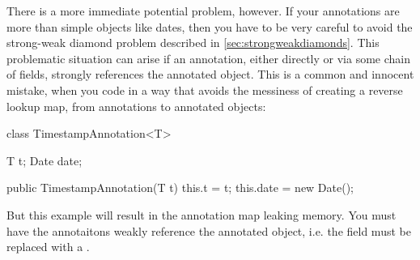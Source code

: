 There is a more immediate potential problem, however. If your annotations are
more than simple objects like dates, then you have to be very careful to avoid
the strong-weak diamond problem described in \autoref{sec:strongweakdiamonds}.
This problematic situation can arise if an annotation, either directly or via
some chain of fields, strongly references the annotated object. This is a common
and innocent mistake, when you code in a way that avoids the messiness of
creating a reverse lookup map, from annotations to annotated objects:
\begin{shortlisting}
class TimestampAnnotation<T> {
   T t;
   Date date;
   
   public TimestampAnnotation(T t) {
      this.t = t;
      this.date = new Date();
   }
}
\end{shortlisting}
But this example will result in the annotation map leaking memory. You must have
the annotaitons weakly reference the annotated object, i.e. the  field
must be replaced with a . 

